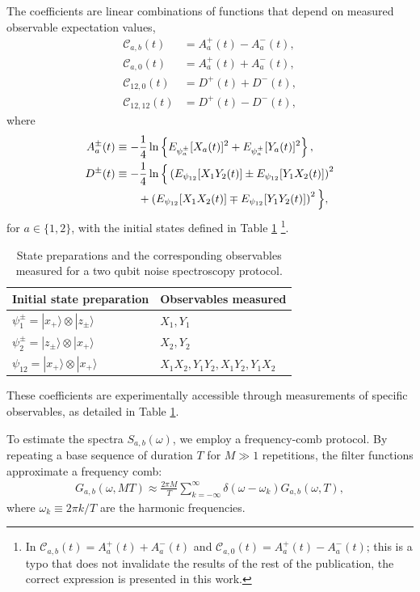 \documentclass[%
 reprint,
superscriptaddress,
 amsmath,amssymb,
 aps,
pra,
floatfix,
]{revtex4-2}
\begin{document}
The coefficients are linear combinations of functions that depend on measured observable expectation values,
\begin{align}
    \label{eq::typo1}
    \mathcal{C}_{a,b}(t)&=A^+_a(t)-A^-_a(t),\\
    \label{eq::typo2}
    \mathcal{C}_{a,0}(t)&=A^+_a(t)+A^-_a(t),\\
    \mathcal{C}_{12,0}(t)&=D^+(t)+D^-(t),\\
    \mathcal{C}_{12,12}(t)&=D^+(t)-D^-(t),
\end{align}
where
\begin{align}
    A^\pm_a(t)&\equiv -\frac{1}{4}\ln\left\{E_{\psi_a^\pm}[X_a(t)]^2+E_{\psi_a^\pm}[Y_a(t)]^2\right\},\\
    D^\pm(t)&\equiv-\frac{1}{4}\ln\Big\{\left(E_{\psi_{12}}[X_1Y_2(t)]\pm E_{\psi_{12}}[Y_1X_2(t)]\right)^2\notag\\
    &\qquad+\left(E_{\psi_{12}}[X_1X_2(t)]\mp E_{\psi_{12}}[Y_1Y_2(t)]\right)^2\Big\},
\end{align}
for $a\in\{1,2\}$, with the initial states defined in Table \ref{tab:init} \footnote{In \cite{PhysRevA.95.022121} $\mathcal{C}_{a,b}(t)=A^+_a(t)+A^-_a(t)$ and $\mathcal{C}_{a,0}(t)=A^+_a(t)-A^-_a(t)$; this is a typo that does not invalidate the results of the rest of the publication, the correct expression is presented in this work.}.
\begin{table}[b!]
    \centering
    \renewcommand{\arraystretch}{1.5}
    \begin{tabular}{|l|l|}
        \hline
        \textbf{Initial state preparation} & \textbf{Observables measured} \\
        \hline
        $\psi^\pm_1=|x_+\rangle\otimes|z_\pm\rangle$ & $X_1, Y_1$ \\
        $\psi^\pm_2=|z_\pm\rangle\otimes|x_+\rangle$ & $X_2, Y_2$ \\
        $\psi_{12}=|x_+\rangle\otimes|x_+\rangle$ & $X_1X_2, Y_1Y_2, X_1Y_2, Y_1X_2$ \\
        \hline
    \end{tabular}
    \caption{State preparations and the corresponding observables measured for a two qubit noise spectroscopy protocol.}
    \label{tab:init}
\end{table}

These coefficients are experimentally accessible through measurements of specific observables, as detailed in Table \ref{tab:init}. 

To estimate the spectra $S_{a,b}(\omega)$, we employ a frequency-comb protocol. By repeating a base sequence of duration $T$ for $M \gg 1$ repetitions, the filter functions approximate a frequency comb:
\begin{align}\label{eq::comb}
    G_{a,b}(\omega,MT)\approx\frac{2\pi M}{T}\sum_{k=-\infty}^\infty\delta(\omega-\omega_k)G_{a,b}(\omega,T),
\end{align}
where $\omega_k\equiv 2\pi k/T$ are the harmonic frequencies. 
\end{document}
